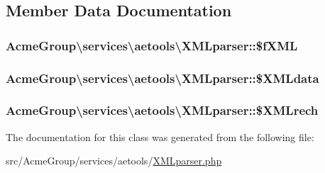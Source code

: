 \subsection{Member Data Documentation}
\hypertarget{class_acme_group_1_1services_1_1aetools_1_1_x_m_lparser_acbda79c808fe81cff55db8648725da8c}{
\subsubsection[{\$f\+X\+M\+L}]{\setlength{\rightskip}{0pt plus 5cm}Acme\+Group\textbackslash{}services\textbackslash{}aetools\textbackslash{}\+X\+M\+Lparser\+::\$f\+X\+M\+L}}\label{class_acme_group_1_1services_1_1aetools_1_1_x_m_lparser_acbda79c808fe81cff55db8648725da8c}
\hypertarget{class_acme_group_1_1services_1_1aetools_1_1_x_m_lparser_ae5d29fcae693c85c9e6f076dfe6327af}{
\subsubsection[{\$\+X\+M\+Ldata}]{\setlength{\rightskip}{0pt plus 5cm}Acme\+Group\textbackslash{}services\textbackslash{}aetools\textbackslash{}\+X\+M\+Lparser\+::\$\+X\+M\+Ldata}}\label{class_acme_group_1_1services_1_1aetools_1_1_x_m_lparser_ae5d29fcae693c85c9e6f076dfe6327af}
\hypertarget{class_acme_group_1_1services_1_1aetools_1_1_x_m_lparser_ace5fba31ca322e000d2ee3caf63eef90}{
\subsubsection[{\$\+X\+M\+Lrech}]{\setlength{\rightskip}{0pt plus 5cm}Acme\+Group\textbackslash{}services\textbackslash{}aetools\textbackslash{}\+X\+M\+Lparser\+::\$\+X\+M\+Lrech}}\label{class_acme_group_1_1services_1_1aetools_1_1_x_m_lparser_ace5fba31ca322e000d2ee3caf63eef90}


The documentation for this class was generated from the following file\+:\begin{DoxyCompactItemize}
\item 
src/\+Acme\+Group/services/aetools/\hyperlink{_x_m_lparser_8php}{X\+M\+Lparser.\+php}\end{DoxyCompactItemize}
